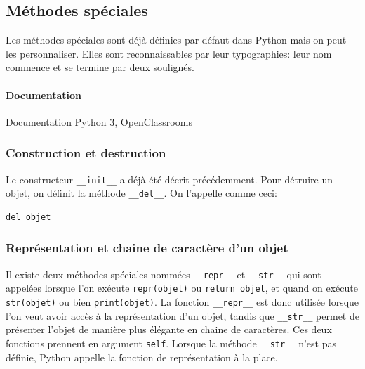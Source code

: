 \documentclass[a4paper, 10pt]{article}
\newcommand{\code}[1]{{\small\texttt{#1}}}
\begin{document}
\subsection{Méthodes spéciales}
 Les méthodes spéciales sont déjà définies par défaut dans Python mais on peut les personnaliser. Elles sont reconnaissables par leur typographies: leur nom commence et se termine par deux soulignés.

\paragraph{Documentation} \href{https://docs.python.org/3/reference/datamodel.html#specialnames}{Documentation Python 3}, \href{https://openclassrooms.com/courses/apprenez-a-programmer-en-python/les-methodes-speciales-1}{OpenClassrooms}
\subsubsection{Construction et destruction}
Le constructeur \code{\_\_init\_\_} a déjà été décrit précédemment. Pour détruire un objet, on définit la méthode \code{\_\_del\_\_}\index{\code{\_\_del\_\_}}. On l'appelle comme ceci:
\begin{verbatim}
del objet
\end{verbatim}

\subsubsection{Représentation et chaine de caractère d'un objet}
Il existe deux méthodes spéciales nommées \code{\_\_repr\_\_}\index{\code{\_\_repr\_\_}} et \code{\_\_str\_\_}\index{\code{\_\_str\_\_}} qui sont appelées lorsque l'on exécute \code{repr(objet)} ou \code{return objet}, et quand on exécute \code{str(objet)} ou bien \code{print(objet)}. La fonction \code{\_\_repr\_\_} est donc utilisée lorsque l'on veut avoir accès à la représentation d'un objet, tandis que \code{\_\_str\_\_} permet de présenter l'objet de manière plus élégante en chaine de caractères. Ces deux fonctions prennent en argument \code{self}. Lorsque la méthode \code{\_\_str\_\_} n'est pas définie, Python appelle la fonction de représentation à la place.
\end{document}
